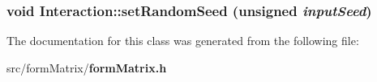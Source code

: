 \subsubsection{\setlength{\rightskip}{0pt plus 5cm}void Interaction::set\-Random\-Seed (unsigned {\em input\-Seed})\hspace{0.3cm}{\tt  [inline]}}\label{classInteraction_49b8d828e29a19bfe4f4566e71d30faf}




The documentation for this class was generated from the following file:\begin{CompactItemize}
\item 
src/form\-Matrix/\bf{form\-Matrix.h}\end{CompactItemize}
